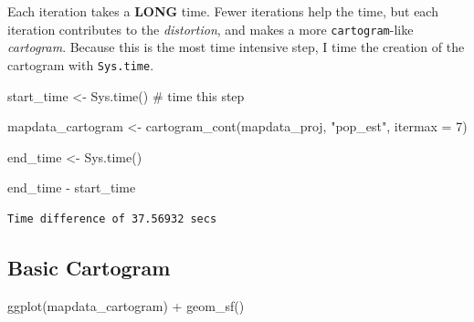 \documentclass[
  letterpaper,
  DIV=11,
  numbers=noendperiod,
  oneside]{scrreprt}
\newenvironment{Shaded}{\begin{snugshade}}{\end{snugshade}}
\newcommand{\AttributeTok}[1]{\textcolor[rgb]{0.40,0.45,0.13}{#1}}
\newcommand{\CommentTok}[1]{\textcolor[rgb]{0.37,0.37,0.37}{#1}}
\newcommand{\DecValTok}[1]{\textcolor[rgb]{0.68,0.00,0.00}{#1}}
\newcommand{\FunctionTok}[1]{\textcolor[rgb]{0.28,0.35,0.67}{#1}}
\newcommand{\NormalTok}[1]{\textcolor[rgb]{0.00,0.23,0.31}{#1}}
\newcommand{\OtherTok}[1]{\textcolor[rgb]{0.00,0.23,0.31}{#1}}
\newcommand{\SpecialCharTok}[1]{\textcolor[rgb]{0.37,0.37,0.37}{#1}}
\newcommand{\StringTok}[1]{\textcolor[rgb]{0.13,0.47,0.30}{#1}}
\begin{document}
\begin{tcolorbox}[enhanced jigsaw, opacityback=0, colback=white, toprule=.15mm, colframe=quarto-callout-tip-color-frame, bottomrule=.15mm, title=\textcolor{quarto-callout-tip-color}{\faLightbulb}\hspace{0.5em}{Tip}, coltitle=black, toptitle=1mm, bottomtitle=1mm, arc=.35mm, breakable, colbacktitle=quarto-callout-tip-color!10!white, left=2mm, rightrule=.15mm, titlerule=0mm, leftrule=.75mm, opacitybacktitle=0.6]

Each iteration takes a \textbf{LONG} time. Fewer iterations help the
time, but each iteration contributes to the \emph{distortion}, and makes
a more \texttt{cartogram}-like \emph{cartogram}. Because this is the
most time intensive step, I time the creation of the cartogram with
\texttt{Sys.time}.

\end{tcolorbox}

\begin{Shaded}
\begin{Highlighting}[]
\NormalTok{start\_time }\OtherTok{\textless{}{-}} \FunctionTok{Sys.time}\NormalTok{() }\CommentTok{\# time this step}

\NormalTok{mapdata\_cartogram }\OtherTok{\textless{}{-}} \FunctionTok{cartogram\_cont}\NormalTok{(mapdata\_proj, }
                                  \StringTok{"pop\_est"}\NormalTok{, }
                                  \AttributeTok{itermax =} \DecValTok{7}\NormalTok{)}

\NormalTok{end\_time }\OtherTok{\textless{}{-}} \FunctionTok{Sys.time}\NormalTok{()}

\NormalTok{end\_time }\SpecialCharTok{{-}}\NormalTok{ start\_time}
\end{Highlighting}
\end{Shaded}

\begin{verbatim}
Time difference of 37.56932 secs
\end{verbatim}

\subsection{Basic Cartogram}\label{basic-cartogram}

\begin{Shaded}
\begin{Highlighting}[]
\FunctionTok{ggplot}\NormalTok{(mapdata\_cartogram) }\SpecialCharTok{+} 
  \FunctionTok{geom\_sf}\NormalTok{()}
\end{Highlighting}
\end{Shaded}
\end{document}

